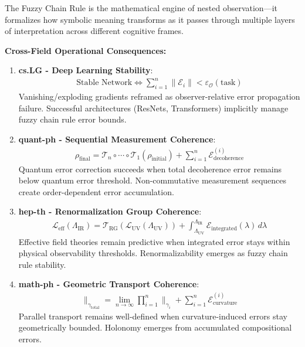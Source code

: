\begin{scholium}
\label{scholium:bk4_nested_frames}
The Fuzzy Chain Rule is the mathematical engine of nested observation—it formalizes how symbolic meaning transforms as it passes through multiple layers of interpretation across different cognitive frames.

\textbf{Cross-Field Operational Consequences:}

\begin{enumerate}
\item \textbf{cs.LG - Deep Learning Stability}: 
   \begin{align}
   \text{Stable Network} \Leftrightarrow \sum_{i=1}^{n} \|\mathcal{E}_i\| < \varepsilon_{\mathcal{O}}(\text{task})
   \end{align}
   Vanishing/exploding gradients reframed as observer-relative error propagation failure. Successful architectures (ResNets, Transformers) implicitly manage fuzzy chain rule error bounds.

\item \textbf{quant-ph - Sequential Measurement Coherence}:
   \begin{align}
   \rho_{\text{final}} = \mathcal{T}_n \circ \cdots \circ \mathcal{T}_1(\rho_{\text{initial}}) + \sum_{i=1}^{n} \mathcal{E}_{\text{decoherence}}^{(i)}
   \end{align}
   Quantum error correction succeeds when total decoherence error remains below quantum error threshold. Non-commutative measurement sequences create order-dependent error accumulation.

\item \textbf{hep-th - Renormalization Group Coherence}:
   \begin{align}
   \mathcal{L}_{\text{eff}}(\Lambda_{\text{IR}}) = \mathcal{T}_{\text{RG}}(\mathcal{L}_{\text{UV}}(\Lambda_{\text{UV}})) + \int_{\Lambda_{\text{UV}}}^{\Lambda_{\text{IR}}} \mathcal{E}_{\text{integrated}}(\lambda) \, d\lambda
   \end{align}
   Effective field theories remain predictive when integrated error stays within physical observability thresholds. Renormalizability emerges as fuzzy chain rule stability.

\item \textbf{math-ph - Geometric Transport Coherence}:
   \begin{align}
   \parallel_{\gamma_{\text{total}}} = \lim_{n \to \infty} \prod_{i=1}^{n} \parallel_{\gamma_i} + \sum_{i=1}^{n} \mathcal{E}_{\text{curvature}}^{(i)}
   \end{align}
   Parallel transport remains well-defined when curvature-induced errors stay geometrically bounded. Holonomy emerges from accumulated compositional errors.


\end{enumerate}
\end{scholium}

